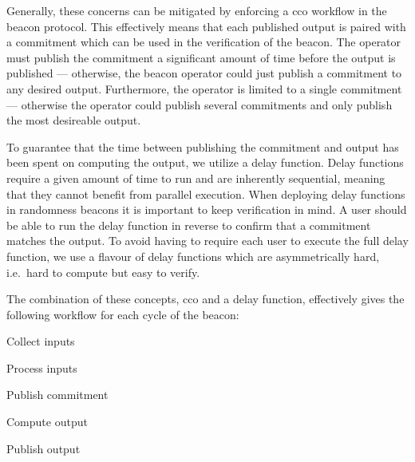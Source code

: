 Generally, these concerns can be mitigated by enforcing a \gls{cco} workflow in the beacon protocol.
This effectively means that each published output is paired with a commitment which can be used in the verification of the beacon.
The operator must publish the commitment a significant amount of time before the output is published --- otherwise, the beacon operator could just publish a commitment to any desired output. Furthermore, the operator is limited to a single commitment --- otherwise the operator could publish several commitments and only publish the most desireable output.

To guarantee that the time between publishing the commitment and output has been spent on computing the output, we utilize a delay function.
Delay functions require a given amount of time to run and are inherently sequential, meaning that they cannot benefit from parallel execution.
When deploying delay functions in randomness beacons it is important to keep verification in mind.
A user should be able to run the delay function in reverse to confirm that a commitment matches the output.
To avoid having to require each user to execute the full delay function, we use a flavour of delay functions which are asymmetrically hard, i.e.\ hard to compute but easy to verify.

The combination of these concepts, \gls{cco} and a delay function, effectively gives the following workflow for each cycle of the beacon:

\begin{enumberate}
    \item Collect inputs
    \item Process inputs
    \item Publish commitment
    \item Compute output
    \item Publish output
\end{enumberate}

